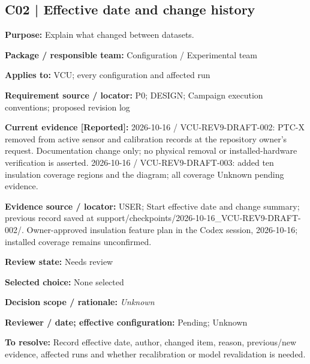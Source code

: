 \documentclass[11pt]{article}
\begin{document}
\par\noindent\begin{minipage}{\textwidth}\small\setlength{\parskip}{2pt}
\subsection*{C02 | Effective date and change history}
\textbf{Purpose:} Explain what changed between datasets.\par
\textbf{Package / responsible team:} Configuration / Experimental team\par
\textbf{Applies to:} VCU; every configuration and affected run\par
\textbf{Requirement source / locator:} P0; DESIGN; Campaign execution conventions; proposed revision log\par
\textbf{Current evidence [Reported]:} 2026-10-16 / VCU-REV9-DRAFT-002: PTC-X removed from active sensor and calibration records at the repository owner's request. Documentation change only; no physical removal or installed-hardware verification is asserted. 2026-10-16 / VCU-REV9-DRAFT-003: added ten insulation coverage regions and the diagram; all coverage Unknown pending evidence.\par
\textbf{Evidence source / locator:} USER; Start effective date and change summary; previous record saved at support/checkpoints/2026-10-16\_\allowbreak{}VCU-REV9-DRAFT-002/. Owner-approved insulation feature plan in the Codex session, 2026-10-16; installed coverage remains unconfirmed.\par
\textbf{Review state:} Needs review\par
\textbf{Selected choice:} None selected\par
\textbf{Decision scope / rationale:} \textit{Unknown}\par
\textbf{Reviewer / date; effective configuration:} Pending; Unknown\par
\textbf{To resolve:} Record effective date, author, changed item, reason, previous/new evidence, affected runs and whether recalibration or model revalidation is needed.\par
\end{minipage}\par\vspace{5pt}
\end{document}
